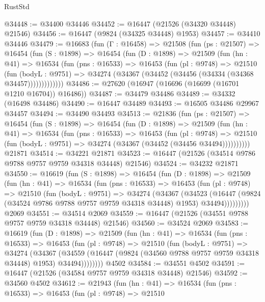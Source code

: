 \begin{lexlean}{RustStd}
\begin{coremodule}
@34448 := @34400 @34446
@34452 := @16447 (@21526 (@34320 @34448) @21546)
@34456 := @16447 (@9824 (@34325 @34448) @1953)
@34457 := @34410 @34446
@34479 := @16683
    (fun (Γ : @16458) =>
    @21508
      (fun (ps : @21507) =>
      @16454
        (fun (S : @1898) =>
        @16454
          (fun (D : @1898) =>
          @21509
            (fun (hn : @41) =>
            @16534
              (fun (pns : @16533) =>
              @16453
                (fun (pl : @9748) =>
                @21510
                  (fun (bodyL : @9751) =>
                  @34274 (@34367 (@34452 (@34456 (@34334 (@34368 @34457)))))))))))))
@34486 := @27620 (@16947 (@16696 (@16699 (@16701 @1210 @16704)) @16486))
@34487 := @34479 @34486
@34489 := @34332 (@16498 @34486)
@34490 := @16447 @34489
@34493 := @16505 @34486 @29967 @34457
@34494 := @34490 @34493
@34513 := @21836
    (fun (ps : @21507) =>
    @16454
      (fun (S : @1898) =>
      @16454
        (fun (D : @1898) =>
        @21509
          (fun (hn : @41) =>
          @16534
            (fun (pns : @16533) =>
            @16453
              (fun (pl : @9748) =>
              @21510 (fun (bodyL : @9751) => @34274 (@34367 (@34452 (@34456 @34494))))))))))
    @21871
@34514 := @34221 @21871
@34523 := @16447 (@21526 (@34514 @9786 @9788 @9757 @9759 @34318 @34448) @21546)
@34524 := @34232 @21871
@34550 := @16619
    (fun (S : @1898) =>
    @16454
      (fun (D : @1898) =>
      @21509
        (fun (hn : @41) =>
        @16534
          (fun (pns : @16533) =>
          @16453
            (fun (pl : @9748) =>
            @21510
              (fun (bodyL : @9751) =>
              @34274
                (@34367
                  (@34523
                    (@16447
                      (@9824 (@34524 @9786 @9788 @9757 @9759 @34318 @34448) @1953)
                      @34494)))))))))
    @2069
@34551 := @34514 @2069
@34559 := @16447 (@21526 (@34551 @9788 @9757 @9759 @34318 @34448) @21546)
@34560 := @34524 @2069
@34583 := @16619
    (fun (D : @1898) =>
    @21509
      (fun (hn : @41) =>
      @16534
        (fun (pns : @16533) =>
        @16453
          (fun (pl : @9748) =>
          @21510
            (fun (bodyL : @9751) =>
            @34274
              (@34367
                (@34559
                  (@16447 (@9824 (@34560 @9788 @9757 @9759 @34318 @34448) @1953) @34494))))))))
    @4502
@34584 := @34551 @4502
@34591 := @16447 (@21526 (@34584 @9757 @9759 @34318 @34448) @21546)
@34592 := @34560 @4502
@34612 := @21943
    (fun (hn : @41) =>
    @16534
      (fun (pns : @16533) =>
      @16453
        (fun (pl : @9748) =>
        @21510

\end{coremodule}
\end{lexlean}
